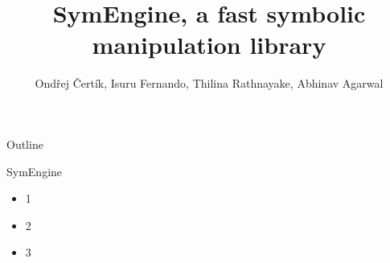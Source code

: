 \documentclass{beamer}
\title[SymEngine \hspace{14em}\insertframenumber/
\inserttotalframenumber]{SymEngine, a fast symbolic manipulation library}
\author[O. Čertík, I. Fernando, ...]{Ondřej Čertík, Isuru Fernando, Thilina Rathnayake, Abhinav Agarwal}
\begin{document}
\begin{frame}
\maketitle
\end{frame}

\begin{frame}{Outline}
\begin{block}{SymEngine}
\begin{itemize}
\item 1
\item 2
\item 3
\end{itemize}
\end{block}
\end{frame}
\end{document}

